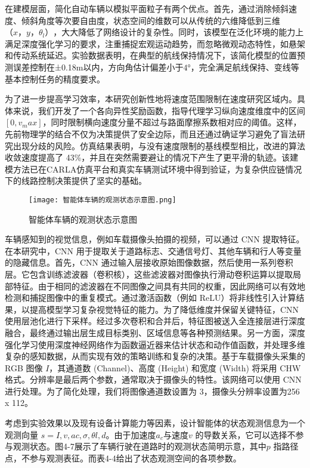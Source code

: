 在建模层面，简化自动车辆以模拟平面粒子有两个优点。首先，通过消除倾斜速度、倾斜角度等次要自由度，状态空间的维数可以从传统的六维降低到三维\(（x，y，θ_l）\)，大大降低了网络设计的复杂性。同时，该模型在泛化环境的能力上满足深度强化学习的要求，注重捕捉宏观运动趋势，而忽略微观动态特性，如悬架和传动系统延迟。实验数据表明，在典型的航线保持情况下，该简化模型的位置预测误差控制在±0.18m以内，方向角估计偏差小于\(4°\)，完全满足航线保持、变线等基本控制任务的精度要求。

为了进一步提高学习效率，本研究创新性地将速度范围限制在速度研究区域内。具体来说，我们开发了一个各向异性奖励函数，指导代理学习纵向速度维度中的区间 \([0, v_max]\)，同时限制横向速度分量不超过与路面摩擦系数相对应的阈值。这样，先前物理学的结合不仅为决策提供了安全边际，而且还通过确证学习避免了盲法研究出现分歧的风险。仿真结果表明，与没有速度限制的基线模型相比，改进的算法收敛速度提高了 43\%，并且在突然需要避让的情况下产生了更平滑的轨迹。该建模方法已在CARLA仿真平台和真实车辆测试环境中得到验证，为复杂供应链情况下的线路控制决策提供了坚实的基础。

\begin{figure}[hbt]
	\centering
	\texttt{[image: 智能体车辆的观测状态示意图.png]}
	\caption{智能体车辆的观测状态示意图}
	\label{f.example}
\end{figure}

车辆感知到的视觉信息，例如车载摄像头拍摄的视频，可以通过 CNN 提取特征。在本研究中，CNN 用于提取关于道路标志、交通信号灯、其他车辆和行人等变量的隐藏信息。首先，CNN 通过输入层接收原始图像数据，然后使用一系列卷积层。它包含训练滤波器（卷积核），这些滤波器对图像执行滑动卷积运算以提取局部特征。由于相同的滤波器在不同图像之间具有共同的权重，因此网络可以有效地检测和捕捉图像中的重复模式。通过激活函数（例如 ReLU）将非线性引入计算结果，以提高模型学习复杂视觉特征的能力。为了降低维度并保留关键特征，CNN 使用层池化进行下采样。经过多次卷积和合并后，特征图被送入全连接层进行深度融合，最终通过输出层生成目标类别、区域信息等各种预测结果。另一方面，深度强化学习使用深度神经网络作为函数逼近器来估计状态和动作值函数，并处理多维复杂的感知数据，从而实现有效的策略训练和复杂的决策。基于车载摄像头采集的 RGB 图像 \(𝐼\)，其通道数 (Channel)、高度 (Height) 和宽度 (Width) 将采用 CHW 格式。分辨率是最后两个参数，通常取决于摄像头的特性。该网络可以使用 CNN 进行处理。为了简化处理，我们将图像通道数设置为 3，摄像头分辨率设置为256 x 112。

考虑到实验效果以及现有设备计算能力等因素，设计智能体的状态观测信息为一个观测向量 \(s = {𝐼, 𝑣, 𝑎𝑐, 𝜎, 𝜃𝑙, 𝑑}\)。由于加速度\(𝑎_𝑐\)与速度\(𝑣\) 的导数关系，它可以选择不参与观测状态。图4-7展示了车辆行驶在道路时的观测状态简明示意，其中\(𝑝\) 指路径点，不参与观测表征。而表4-4给出了状态观测空间的各项参数。


